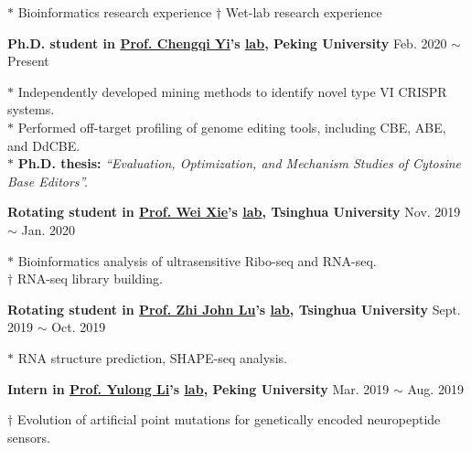 
\small
$*$ Bioinformatics research experience \hspace{2em} $\dagger$ Wet-lab research experience

\normalsize
\vspace{10pt}

\textbf{Ph.D. student in \href{https://www.bio.pku.edu.cn/enhomes/news/teacher_dis/91.html}{Prof. Chengqi Yi}'s \href{https://yilab.org.cn/}{lab}, Peking University} \hfill Feb. 2020 $\sim$ Present

{\small
$*$ Independently developed mining methods to identify novel type VI CRISPR systems.\\
$*$ Performed off-target profiling of genome editing tools, including CBE, ABE, and DdCBE\cite{lei2022mitochondrial,rao2023characterizing,lei2021detect,lei2023detect}.\\
$*$ \textbf{Ph.D. thesis:} \textit{``Evaluation, Optimization, and Mechanism Studies of Cytosine Base Editors''.}
}

\vspace{5pt}

\textbf{Rotating student in \href{https://life.tsinghua.edu.cn/lifeen/info/1034/1077.htm}{Prof. Wei Xie}'s \href{http://www.xielab.org.cn/}{lab}, Tsinghua University} \hfill Nov. 2019 $\sim$ Jan. 2020

{\small
$*$ Bioinformatics analysis of ultrasensitive Ribo-seq and RNA-seq.\\
$\dagger$ RNA-seq library building.
}

\vspace{5pt}

\textbf{Rotating student in \href{https://life.tsinghua.edu.cn/lifeen/info/1034/1083.htm}{Prof. Zhi John Lu}'s \href{https://lulab.life.tsinghua.edu.cn/labhome/home/}{lab}, Tsinghua University} \hfill Sept. 2019 $\sim$ Oct. 2019

{\small
$*$ RNA structure prediction\cite{zhu2021integrative}, SHAPE-seq analysis.
}


\vspace{5pt}


\textbf{Intern in \href{https://www.bio.pku.edu.cn/enhomes/news/teacher_dis/43.html}{Prof. Yulong Li}'s \href{http://www.yulonglilab.org/}{lab}, Peking University} \hfill Mar. 2019 $\sim$ Aug. 2019

{\small
$\dagger$ Evolution of artificial point mutations for genetically encoded neuropeptide sensors.
}


